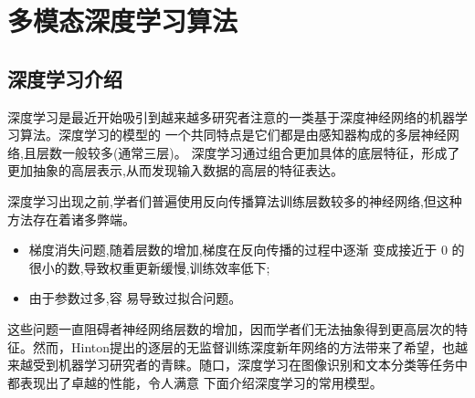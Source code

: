 
\chapter{多模态深度学习算法}
\label{chap:chap6}

\section{深度学习介绍}
	深度学习是最近开始吸引到越来越多研究者注意的一类基于深度神经网络的机器学习算法。深度学习的模型的 一个共同特点是它们都是由感知器构成的多层神经网络,且层数一般较多(通常三层)。 深度学习通过组合更加具体的底层特征，形成了更加抽象的高层表示,从而发现输入数据的高层的特征表达。
	
	深度学习出现之前,学者们普遍使用反向传播算法训练层数较多的神经网络,但这种方法存在着诸多弊端。
	\begin{itemize}
		\item 梯度消失问题,随着层数的增加,梯度在反向传播的过程中逐渐 变成接近于 0 的很小的数,导致权重更新缓慢,训练效率低下;
		\item 由于参数过多,容 易导致过拟合问题。
	\end{itemize}
	
	这些问题一直阻碍者神经网络层数的增加，因而学者们无法抽象得到更高层次的特征。然而，Hinton提出的逐层的无监督训练深度新年网络的方法带来了希望，也越来越受到机器学习研究者的青睐。随口，深度学习在图像识别和文本分类等任务中都表现出了卓越的性能，令人满意 下面介绍深度学习的常用模型。
